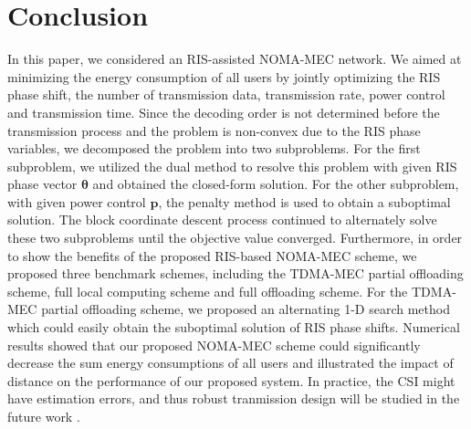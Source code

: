 \documentclass[journal]{IEEEtran}
\begin{document}
\section{Conclusion}
In this paper, we considered an RIS-assisted NOMA-MEC network. We aimed at minimizing the energy consumption of all users by jointly optimizing the RIS phase shift, the number of transmission data, transmission rate, power control and transmission time. Since the decoding order is not determined before the transmission process and the problem is non-convex due to the RIS phase variables,
we decomposed the problem into two subproblems. For the first subproblem,
we utilized the dual method to resolve this problem with given RIS phase vector $\pmb \theta$ and obtained the closed-form solution. For the other subproblem, with given power control $\pmb p$, the penalty method is used to obtain a suboptimal solution.
The block coordinate descent process continued to alternately solve these two subproblems until the objective value converged.
Furthermore, in order to show the benefits of the proposed RIS-based NOMA-MEC scheme, we proposed three benchmark schemes, including the TDMA-MEC partial offloading scheme, full local computing scheme and full offloading scheme.
For the TDMA-MEC partial offloading scheme, we proposed an alternating 1-D search method which could easily obtain the suboptimal solution of RIS phase shifts. Numerical results showed that our proposed NOMA-MEC scheme could significantly decrease the sum energy consumptions of all users and illustrated the impact of distance on the performance of our proposed system. {In practice, the CSI might have estimation errors, and thus robust tranmission design will be studied in the future work \cite{robustcun,robustpan}.}
 






 

\end{document}
